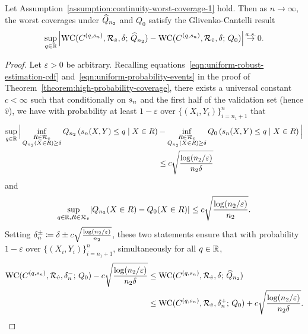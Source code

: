 \begin{lemma}
  \label{lem:consistency-of-empirical-worst-coverages}
  Let
  Assumption~\ref{assumption:continuity-worst-coverage-1} hold.
  Then as $n \to \infty$,
  the worst coverages under $\widehat{Q}_{n_2}$ and $Q_0$ satisfy
  the Glivenko-Cantelli result
  \begin{align*}
    \sup_{q\in \mathbb{R}} \left| 
    \textup{WC}( C^{(q,s_n)}, \mathcal{R}_{\hat v}, \delta; \, \widehat{Q}_{n_2})-\textup{WC}( {C}^{(q, s_n)}, \mathcal{R}_{\hat v}, \delta; \, Q_0) \right| 
    \mathop{\stackrel{a.s.}{\rightarrow}} 0.
  \end{align*}
\end{lemma}
\begin{proof}
  Let $\varepsilon > 0$ be arbitrary.  Recalling
  equations~\eqref{eqn:uniform-robust-estimation-cdf}
  and~\eqref{eqn:uniform-probability-events} in the proof of
  Theorem~\ref{theorem:high-probability-coverage}, there exists a universal
  constant $c < \infty$ such that conditionally on $s_n$ and the first
  half of the validation set (hence $\hat v$), we have with probability at
  least $1- \varepsilon$ over $\{ (X_i, Y_i) \}_{i=n_1+1}^{n}$ that
  \begin{align*}
    \begin{split}
      \sup_{q \in \mathbb{R}} \Big| \inf_{\substack{R \in \mathcal{R}_{\hat v} \\ Q_{n_2} (X\in R) \ge \delta }} Q_{n_2}\left( s_n(X,Y) \le q \mid X \in R \right) &-  
      \inf_{\substack{R \in \mathcal{R}_{\hat v} \\ Q_{n_2}(X\in R) \ge \delta }} Q_0\left( s_n(X,Y) \le q \mid X \in R \right) \Big|  \\
      &\le c \sqrt{\frac{\log(n_2/\varepsilon)}{n_2\delta}}
    \end{split}
  \end{align*}
  and
  \begin{align*}
    \sup_{q \in \mathbb{R}, R \in \mathcal{R}_{\hat v}} \lvert Q_{n_2}( X \in R) - Q_0(X \in R) \rvert \le  c \sqrt{\frac{\log(n_2/\varepsilon)}{n_2}}.
  \end{align*}
  Setting $\delta_n^\pm \coloneqq \delta \pm c
  \sqrt{\frac{\log(n_2/\varepsilon)}{n_2}}$, these two statements ensure
  that with probability $1-\varepsilon$ over $\{ (X_i, Y_i)
  \}_{i=n_1+1}^{n}$, simultaneously for all $q \in \mathbb{R}$,
  \begin{align*}
    \textup{WC}( C^{(q,s_n)}, \mathcal{R}_{\hat v}, \delta_n^-; \, Q_0)
    -  c \sqrt{\frac{\log(n_2 /\varepsilon)}{n_2 \delta}} &\le 
    \textup{WC}( C^{(q,s_n)}, \mathcal{R}_{\hat v}, \delta; \, \widehat{Q}_{n_2}) \\
    &\le \textup{WC}( C^{(q,s_n)}, \mathcal{R}_{\hat v}, \delta_n^+; \, Q_0) +
    c \sqrt{\frac{\log(n_2/\varepsilon)}{n_2\delta}}.
  \end{align*}


\end{proof}
